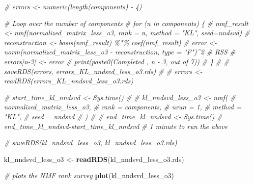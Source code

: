 \documentclass[
]{article}
\newenvironment{Shaded}{\begin{snugshade}}{\end{snugshade}}
\newcommand{\CommentTok}[1]{\textcolor[rgb]{0.56,0.35,0.01}{\textit{#1}}}
\newcommand{\FunctionTok}[1]{\textcolor[rgb]{0.13,0.29,0.53}{\textbf{#1}}}
\newcommand{\NormalTok}[1]{#1}
\newcommand{\OtherTok}[1]{\textcolor[rgb]{0.56,0.35,0.01}{#1}}
\newcommand{\StringTok}[1]{\textcolor[rgb]{0.31,0.60,0.02}{#1}}
\begin{document}
\begin{Shaded}
\begin{Highlighting}[]
\CommentTok{\# errors \textless{}{-} numeric(length(components) {-} 4)}

\CommentTok{\# Loop over the number of components}
\CommentTok{\# for (n in components) \{}
\CommentTok{\#   nmf\_result \textless{}{-} nmf(normalized\_matrix\_less\_o3, rank = n, method = "KL", seed=\textquotesingle{}nndsvd\textquotesingle{})}
\CommentTok{\#   reconstruction \textless{}{-} basis(nmf\_result) \%*\% coef(nmf\_result)}
\CommentTok{\#   error \textless{}{-} norm(normalized\_matrix\_less\_o3 {-} reconstruction, type = "F")\^{}2 \# RSS}
\CommentTok{\#   errors[n{-}3] \textless{}{-} error}
\CommentTok{\#   print(paste0(\textquotesingle{}Completed \textquotesingle{}, n {-} 3, \textquotesingle{} out of 7\textquotesingle{}))}
\CommentTok{\# \}}
\CommentTok{\# }
\CommentTok{\# saveRDS(errors, \textquotesingle{}errors\_KL\_nndsvd\_less\_o3.rds\textquotesingle{})}
\CommentTok{\# }
\CommentTok{\# errors \textless{}{-} readRDS(\textquotesingle{}errors\_KL\_nndsvd\_less\_o3.rds\textquotesingle{})}

\CommentTok{\# start\_time\_kl\_nndsvd \textless{}{-} Sys.time()}
\CommentTok{\# }
\CommentTok{\# kl\_nndsvd\_less\_o3 \textless{}{-} nmf(}
\CommentTok{\#   normalized\_matrix\_less\_o3,}
\CommentTok{\#   rank = components,}
\CommentTok{\#   nrun = 1,}
\CommentTok{\#   method = "KL",}
\CommentTok{\#   seed = \textquotesingle{}nndsvd\textquotesingle{}}
\CommentTok{\# )}
\CommentTok{\# }
\CommentTok{\# end\_time\_kl\_nndsvd \textless{}{-} Sys.time()}
\CommentTok{\# end\_time\_kl\_nndsvd{-}start\_time\_kl\_nndsvd}
\CommentTok{\# 1 minute to run the above}

\CommentTok{\# saveRDS(kl\_nndsvd\_less\_o3, \textquotesingle{}kl\_nndsvd\_less\_o3.rds\textquotesingle{})}

\NormalTok{kl\_nndsvd\_less\_o3 }\OtherTok{\textless{}{-}} \FunctionTok{readRDS}\NormalTok{(}\StringTok{\textquotesingle{}kl\_nndsvd\_less\_o3.rds\textquotesingle{}}\NormalTok{)}
\end{Highlighting}
\end{Shaded}

\begin{Shaded}
\begin{Highlighting}[]
\CommentTok{\# plots the NMF rank survey}
\FunctionTok{plot}\NormalTok{(kl\_nndsvd\_less\_o3)}
\end{Highlighting}
\end{Shaded}
\end{document}
